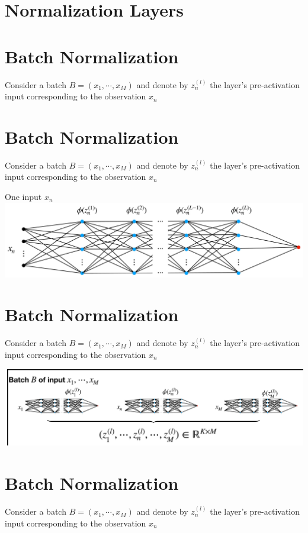 \documentclass[10pt]{article}
\begin{document}
\section*{Normalization Layers}
\section*{Batch Normalization}
Consider a batch $B=\left(x_{1}, \cdots, x_{M}\right)$ and denote by $z_{n}^{(l)}$ the layer's pre-activation input corresponding to the observation $x_{n}$

\section*{Batch Normalization}
Consider a batch $B=\left(x_{1}, \cdots, x_{M}\right)$ and denote by $z_{n}^{(l)}$ the layer's pre-activation input corresponding to the observation $x_{n}$

One input $x_{n}$
\includegraphics[max width=\textwidth, center]{2023_12_30_360102aa01a03e5a4270g-26}

\section*{Batch Normalization}
Consider a batch $B=\left(x_{1}, \cdots, x_{M}\right)$ and denote by $z_{n}^{(l)}$ the layer's pre-activation input corresponding to the observation $x_{n}$

\begin{center}
\includegraphics[max width=\textwidth]{2023_12_30_360102aa01a03e5a4270g-27}
\end{center}

\section*{Batch Normalization}
Consider a batch $B=\left(x_{1}, \cdots, x_{M}\right)$ and denote by $z_{n}^{(l)}$ the layer's pre-activation input corresponding to the observation $x_{n}$
\end{document}
